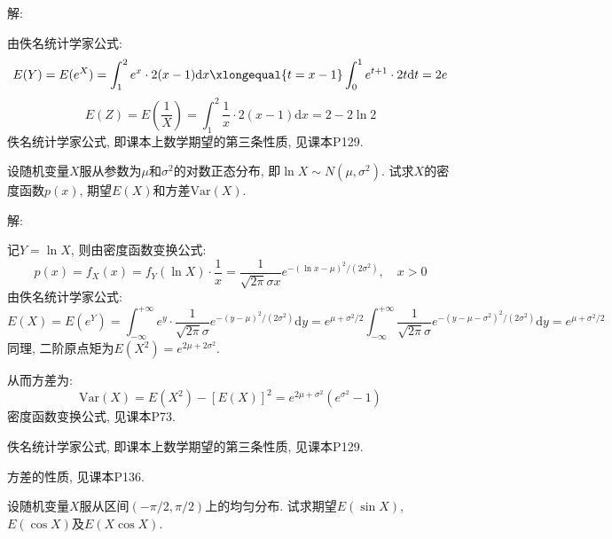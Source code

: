 \documentclass[standard]{ExBook}
\renewenvironment{shaded}{%
  \def\FrameCommand{\fboxsep=\FrameSep \colorbox{shadecolor}}%
  \MakeFramed{\advance\hsize-\width \FrameRestore}%
}{%
  \endMakeFramed
}
\begin{document}
\begin{qitems}
\vspace{\dimexpr2.5cm-5em\relax}

解: 

由佚名统计学家公式:
$$E(Y)=E(e^X)=\displaystyle\int_{1}^{2}e^{x}\cdot2(x-1)\mathrm{d}x \xlongequal{t=x-1} \int_{0}^{1}e^{t+1}\cdot 2t\mathrm{d}t=2e$$
$$E(Z)=E(\frac{1}{X})=\displaystyle\int_{1}^{2}\frac{1}{x}\cdot 2(x-1)\mathrm{d}x=2-2\ln 2$$
\textcolor{themeColor}{\selectfont {} 佚名统计学家公式, 即课本上数学期望的第三条性质, 见课本P129.}

\vspace{2.5cm-5em}

    \begin{bbox}
    \begin{shaded}
        \qitem
设随机变量$ X $服从参数为$\mu$和$\sigma^2$的对数正态分布, 即$\ln X\sim N(\mu,\sigma^2)$. 试求$ X $的密度函数$p(x)$, 期望$ E(X) $和方差$\mathrm{Var}(X)$.
    \end{shaded}
    \end{bbox}

\vspace{\dimexpr2.5cm-5em\relax}

解: 

记$Y=\ln X$, 则由密度函数变换公式:
$$p(x)=f_{X}(x)=f_{Y}(\ln X)\cdot \frac{1}{x}=\frac{1}{\sqrt{2\pi}\sigma x}e^{-(\ln x-\mu)^2/(2\sigma^2)},\quad x>0$$
由佚名统计学家公式:
$$E(X)=E(e^{Y})=\displaystyle\int_{-\infty}^{+\infty}e^{y}\cdot \frac{1}{\sqrt{2\pi}\sigma}e^{-(y-\mu)^2/(2\sigma^2)}\mathrm{d}y=e^{\mu+\sigma^2/2}\int_{-\infty}^{+\infty}\frac{1}{\sqrt{2\pi}\sigma}e^{-(y-\mu-\sigma^2)^2/(2\sigma^2)}\mathrm{d}y=e^{\mu+\sigma^2/2}$$
同理, 二阶原点矩为$E(X^2)=e^{2\mu+2\sigma^2}$.

从而方差为:
$$\mathrm{Var}(X)=E(X^2)-\left[E(X)\right]^2=e^{2\mu+\sigma^2}(e^{\sigma^2}-1)$$
\textcolor{themeColor}{\selectfont {} 密度函数变换公式, 见课本P73.}

\textcolor{themeColor}{\selectfont {} 佚名统计学家公式, 即课本上数学期望的第三条性质, 见课本P129.}

\textcolor{themeColor}{\selectfont {}
方差的性质, 见课本P136.}

\vspace{2.5cm-5em}

    \begin{bbox}
    \begin{shaded}
        \qitem
设随机变量$ X $服从区间$(-\pi/2,\pi/2)$上的均匀分布. 试求期望$E(\sin X)$, $E(\cos X)$及$E(X \cos X)$.
    \end{shaded}
    \end{bbox}


\end{qitems}
\end{document}
